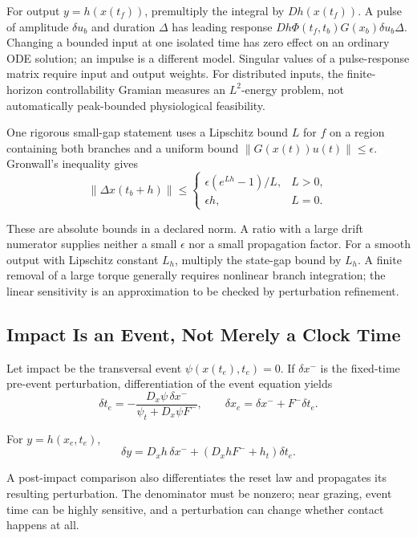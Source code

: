 For output $y=h(x(t_f))$, premultiply the integral by $D h(x(t_f))$. A pulse of amplitude $\delta u_b$ and duration $\Delta$ has leading response $D h\Phi(t_f,t_b)G(x_b)\delta u_b\Delta$. Changing a bounded input at one isolated time has zero effect on an ordinary ODE solution; an impulse is a different model. Singular values of a pulse-response matrix require input and output weights. For distributed inputs, the finite-horizon controllability Gramian measures an $L^2$-energy problem, not automatically peak-bounded physiological feasibility.

One rigorous small-gap statement uses a Lipschitz bound $L$ for $f$ on a region containing both branches and a uniform bound $\|G(x(t))u(t)\|\leq\epsilon$. Gronwall's inequality gives
\begin{equation}
\|\Delta x(t_b+h)\|\leq
\begin{cases}
\epsilon(e^{Lh}-1)/L,&L>0,\\
\epsilon h,&L=0.
\end{cases}
\label{eq:ch7:gap-bound}
\end{equation}

These are absolute bounds in a declared norm. A ratio with a large drift numerator supplies neither a small $\epsilon$ nor a small propagation factor. For a smooth output with Lipschitz constant $L_h$, multiply the state-gap bound by $L_h$. A finite removal of a large torque generally requires nonlinear branch integration; the linear sensitivity is an approximation to be checked by perturbation refinement.

\subsection{Impact Is an Event, Not Merely a Clock Time}
Let impact be the transversal event $\psi(x(t_e),t_e)=0$. If $\delta x^-$ is the fixed-time pre-event perturbation, differentiation of the event equation yields
\begin{equation}
\delta t_e=-\frac{D_x\psi\,\delta x^-}{\psi_t+D_x\psi F^-},\qquad
\delta x_e=\delta x^-+F^-\delta t_e.
\label{eq:ch7:event-sensitivity}
\end{equation}

For $y=h(x_e,t_e)$,
\begin{equation}
\delta y=D_xh\,\delta x^-+(D_xh F^-+h_t)\delta t_e.
\label{eq:ch7:event-output}
\end{equation}

A post-impact comparison also differentiates the reset law and propagates its resulting perturbation. The denominator must be nonzero; near grazing, event time can be highly sensitive, and a perturbation can change whether contact happens at all.

